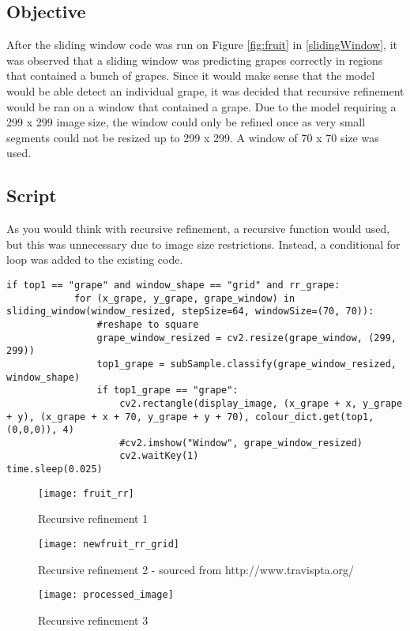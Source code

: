 \tocless\subsection{Objective}
After the sliding window code was run on Figure \ref{fig:fruit} in \ref{slidingWindow},
it was observed that a sliding window was predicting grapes correctly in
regions that contained a bunch of grapes. Since it would make sense that the
model would be able detect an individual grape, it was decided that
recursive refinement would be ran on a window that contained a grape. Due to the model
requiring a 299 x 299 image size, the window could only be refined once as
very small segments could not be resized up to 299 x 299. A window of 70 x 70 size was used.

\tocless\subsection{Script}
As you would think with recursive refinement, a recursive function would used,
but this was unnecessary due to image size restrictions. Instead, a
conditional for loop was added to the existing code.
\begin{lstlisting}[style=Python]
if top1 == "grape" and window_shape == "grid" and rr_grape:
			for (x_grape, y_grape, grape_window) in sliding_window(window_resized, stepSize=64, windowSize=(70, 70)):
				#reshape to square
				grape_window_resized = cv2.resize(grape_window, (299, 299))
				top1_grape = subSample.classify(grape_window_resized, window_shape)
				if top1_grape == "grape":
					cv2.rectangle(display_image, (x_grape + x, y_grape + y), (x_grape + x + 70, y_grape + y + 70), colour_dict.get(top1, (0,0,0)), 4)
					#cv2.imshow("Window", grape_window_resized)
					cv2.waitKey(1)
time.sleep(0.025)
\end{lstlisting}

\begin{figure}
\centering
    \texttt{[image: fruit\_rr]}
      \caption{Recursive refinement 1}
      \label{fig:rr1}
\end{figure}

\begin{figure}
\centering
    \texttt{[image: newfruit\_rr\_grid]}
      \caption{Recursive refinement 2 - sourced from http://www.travispta.org/}
      \label{fig:rr2}
\end{figure}

\begin{figure}
\centering
    \texttt{[image: processed\_image]}
      \caption{Recursive refinement 3}
      \label{fig:rr3}
\end{figure}


